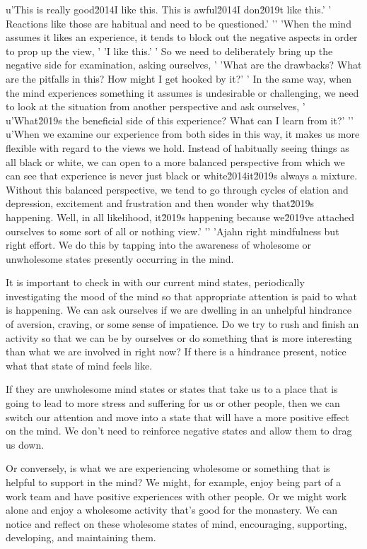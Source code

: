 u'This is really good\u2014I like this. This is awful\u2014I don\u2019t like this.'
' Reactions like those are habitual and need to be questioned.'
'\n'
'When the mind assumes it likes an experience, it tends to block out the negative aspects in order to prop up the view, '
'I like this.'
' So we need to deliberately bring up the negative side for examination, asking ourselves, '
'What are the drawbacks? What are the pitfalls in this? How might I get hooked by it?'
' In the same way, when the mind experiences something it assumes is undesirable or challenging, we need to look at the situation from another perspective and ask ourselves, '
u'What\u2019s the beneficial side of this experience? What can I learn from it?'
'\n'
u'When we examine our experience from both sides in this way, it makes us more flexible with regard to the views we hold. Instead of habitually seeing things as all black or white, we can open to a more balanced perspective from which we can see that experience is never just black or white\u2014it\u2019s always a mixture. Without this balanced perspective, we tend to go through cycles of elation and depression, excitement and frustration and then wonder why that\u2019s happening. Well, in all likelihood, it\u2019s happening because we\u2019ve attached ourselves to some sort of all or nothing view.'
'\n'
'Ajahn  right mindfulness 
but right effort. We do this by tapping into the awareness of wholesome 
or unwholesome states presently occurring in the mind.

It is important to check in with our current mind states, periodically 
investigating the mood of the mind so that appropriate attention is 
paid to what is happening. We can ask ourselves if we are dwelling in 
an unhelpful hindrance of aversion, craving, or some sense of 
impatience. Do we try to rush and finish an activity so that we can be 
by ourselves or do something that is more interesting than what we are 
involved in right now? If there is a hindrance present, notice what 
that state of mind feels like.

If they are unwholesome mind states or states that take us to a place 
that is going to lead to more stress and suffering for us or other 
people, then we can switch our attention and move into a state that 
will have a more positive effect on the mind. We don't need to 
reinforce negative states and allow them to drag us down.

Or conversely, is what we are experiencing wholesome or something that 
is helpful to support in the mind? We might, for example, enjoy being 
part of a work team and have positive experiences with other people. Or 
we might work alone and enjoy a wholesome activity that's good for the 
monastery. We can notice and reflect on these wholesome states of mind, 
encouraging, supporting, developing, and maintaining them.

